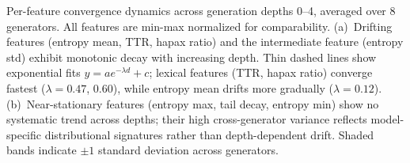 \caption{Per-feature convergence dynamics across generation depths 0--4, averaged over 8 generators. All features are min-max normalized for comparability. (a)~Drifting features (entropy mean, TTR, hapax ratio) and the intermediate feature (entropy std) exhibit monotonic decay with increasing depth. Thin dashed lines show exponential fits $y = a e^{-\lambda d} + c$; lexical features (TTR, hapax ratio) converge fastest ($\lambda{=}0.47$, $0.60$), while entropy mean drifts more gradually ($\lambda{=}0.12$). (b)~Near-stationary features (entropy max, tail decay, entropy min) show no systematic trend across depths; their high cross-generator variance reflects model-specific distributional signatures rather than depth-dependent drift. Shaded bands indicate $\pm 1$ standard deviation across generators.}
\label{fig:convergence-dynamics}

